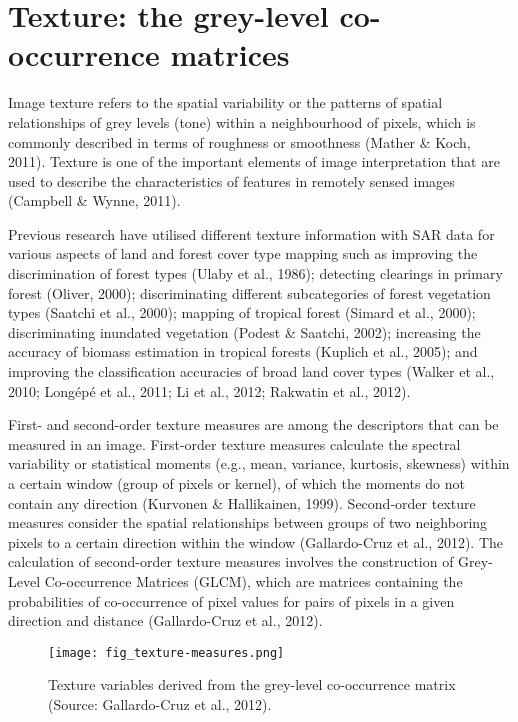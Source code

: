 \section{Texture: the grey-level co-occurrence matrices}
\label{sec: litrev-texture-glcm}

Image texture refers to the spatial variability or the patterns of spatial relationships of grey levels (tone) within a neighbourhood of pixels, which is commonly described in terms of roughness or smoothness (Mather \& Koch, 2011). Texture is one of the important elements of image interpretation that are used to describe the characteristics of features in remotely sensed images (Campbell \& Wynne, 2011).

Previous research have utilised different texture information with SAR data for various aspects of land and forest cover type mapping such as improving the discrimination of forest types (Ulaby et al., 1986); detecting clearings in primary forest (Oliver, 2000); discriminating different subcategories of forest vegetation types (Saatchi et al., 2000); mapping of tropical forest (Simard et al., 2000); discriminating inundated vegetation (Podest \& Saatchi, 2002); increasing the accuracy of biomass estimation in tropical forests (Kuplich et al., 2005); and improving the classification accuracies of broad land cover types (Walker et al., 2010; Longépé et al., 2011; Li et al., 2012; Rakwatin et al., 2012).

First- and second-order texture measures are among the descriptors that can be measured in an image. First-order texture measures calculate the spectral variability or statistical moments (e.g., mean, variance, kurtosis, skewness) within a certain window (group of pixels or kernel), of which the moments do not contain any direction (Kurvonen \& Hallikainen, 1999). Second-order texture measures consider the spatial relationships between groups of two neighboring pixels to a certain direction within the window (Gallardo-Cruz et al., 2012). The calculation of second-order texture measures involves the construction of Grey-Level Co-occurrence Matrices (GLCM), which are matrices containing the probabilities of co-occurrence of pixel values for pairs of pixels in a given direction and distance (Gallardo-Cruz et al., 2012).

\begin{figure}
	\centering
	\texttt{[image: fig\_texture-measures.png]}
	\caption[Texture variables derived from the grey-level co-occurrence matrix.]{Texture variables derived from the grey-level co-occurrence matrix (Source: Gallardo-Cruz et al., 2012).}
	\label{fig: litrev-fig2.4}
\end{figure}

